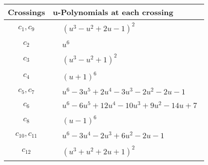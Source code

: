 \documentclass[1p]{elsarticle_modified}
\theoremstyle{definition}
\begin{document}
\begin{tabular}{m{50pt}|m{274pt}}
Crossings & \hspace{64pt}u-Polynomials at each crossing \\
\hline $$\begin{aligned}c_{1},c_{9}\end{aligned}$$&$\begin{aligned}
&(u^3- u^2+2 u-1)^2
\end{aligned}$\\
\hline $$\begin{aligned}c_{2}\end{aligned}$$&$\begin{aligned}
&u^6
\end{aligned}$\\
\hline $$\begin{aligned}c_{3}\end{aligned}$$&$\begin{aligned}
&(u^3- u^2+1)^2
\end{aligned}$\\
\hline $$\begin{aligned}c_{4}\end{aligned}$$&$\begin{aligned}
&(u+1)^6
\end{aligned}$\\
\hline $$\begin{aligned}c_{5},c_{7}\end{aligned}$$&$\begin{aligned}
&u^6-3 u^5+2 u^4-3 u^3-2 u^2-2 u-1
\end{aligned}$\\
\hline $$\begin{aligned}c_{6}\end{aligned}$$&$\begin{aligned}
&u^6-6 u^5+12 u^4-10 u^3+9 u^2-14 u+7
\end{aligned}$\\
\hline $$\begin{aligned}c_{8}\end{aligned}$$&$\begin{aligned}
&(u-1)^6
\end{aligned}$\\
\hline $$\begin{aligned}c_{10},c_{11}\end{aligned}$$&$\begin{aligned}
&u^6-3 u^4-2 u^3+6 u^2-2 u-1
\end{aligned}$\\
\hline $$\begin{aligned}c_{12}\end{aligned}$$&$\begin{aligned}
&(u^3+u^2+2 u+1)^2
\end{aligned}$\\
\hline
\end{tabular}\\~\\
\end{document}
